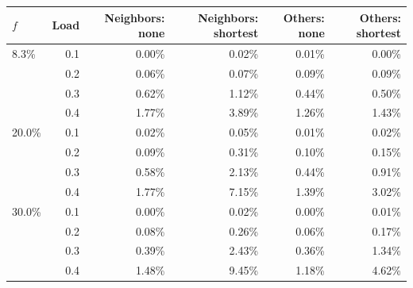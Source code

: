 \begin{tabular}{@{}lrrrrr@{}}
\toprule
$f$ & Load & Neighbors: none & Neighbors: shortest & Others: none & Others: shortest \\
\midrule
8.3\% & 0.1 & 0.00\% & 0.02\% & 0.01\% & 0.00\% \\
 & 0.2 & 0.06\% & 0.07\% & 0.09\% & 0.09\% \\
 & 0.3 & 0.62\% & 1.12\% & 0.44\% & 0.50\% \\
 & 0.4 & 1.77\% & 3.89\% & 1.26\% & 1.43\% \\
\midrule
20.0\% & 0.1 & 0.02\% & 0.05\% & 0.01\% & 0.02\% \\
 & 0.2 & 0.09\% & 0.31\% & 0.10\% & 0.15\% \\
 & 0.3 & 0.58\% & 2.13\% & 0.44\% & 0.91\% \\
 & 0.4 & 1.77\% & 7.15\% & 1.39\% & 3.02\% \\
\midrule
30.0\% & 0.1 & 0.00\% & 0.02\% & 0.00\% & 0.01\% \\
 & 0.2 & 0.08\% & 0.26\% & 0.06\% & 0.17\% \\
 & 0.3 & 0.39\% & 2.43\% & 0.36\% & 1.34\% \\
 & 0.4 & 1.48\% & 9.45\% & 1.18\% & 4.62\% \\
\bottomrule
\end{tabular}
